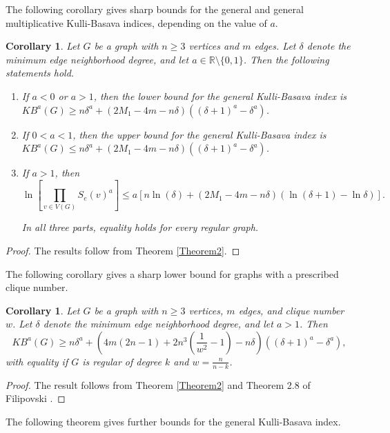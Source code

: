 \documentclass[11pt, oneside]{amsart}   	%
\newtheorem{cor}[theorem]{Corollary}
\theoremstyle{definition}
\theoremstyle{remark}
\numberwithin{equation}{section}
\begin{document}
The following corollary gives sharp bounds for the general and general multiplicative Kulli-Basava indices, depending on the value of $a$.

\begin{cor}
Let $G$ be a graph with $n\geq 3$ vertices and $m$ edges. Let $\delta$ denote the minimum edge neighborhood degree, and let $a\in\mathbb{R}\setminus\{0,1\}$. Then the following statements hold.

\begin{enumerate}
       
\item If $a < 0$ or $ a > 1$, then the lower bound for the general Kulli-Basava index is $KB^a(G) \geq n\delta^a +  (2M_1 - 4m - n\delta) ((\delta + 1)^a - \delta^a)$.

\item If $0 < a < 1$, then the upper bound for the general Kulli-Basava index is $KB^a(G)  \leq n\delta^a +  (2M_1 - 4m - n\delta) ((\delta + 1)^a - \delta^a)$.

\item If $a>1$, then
\[
\ln\left[\prod_{v\in V(G)}S_e(v)^a\right]\leq a\left[n\ln(\delta)+(2M_1-4m-n\delta)(\ln(\delta+1)-\ln\delta)\right].
\]

   
In all three parts, equality holds for every regular graph.
    
\end{enumerate}
       
\end{cor}
\begin{proof}
The results follow from Theorem \ref{Theorem2}.
\end{proof}


The following corollary gives a sharp lower bound for graphs with a prescribed clique number.

\begin{cor}
Let $G$ be a graph with $n\geq 3$ vertices, $m$ edges, and clique number $w$. Let $\delta$ denote the minimum edge neighborhood degree, and let $a>1$. Then
\[
KB^a(G)\geq n\delta^a+\left(4m(2n-1)+2n^3\left(\frac{1}{w^2}-1\right)-n\delta\right)((\delta+1)^a-\delta^a),
\]
with equality if $G$ is regular of degree $k$ and $w=\frac{n}{n-k}$.
\end{cor}
\begin{proof}
The result follows from Theorem \ref{Theorem2} and Theorem 2.8 of Filipovski \cite{filipovski2021new}.
\end{proof}

The following theorem gives further bounds for the general Kulli-Basava index.
\end{document}
